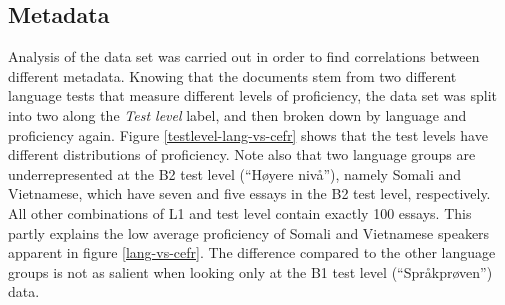 \subsection{Metadata}

Analysis of the data set was carried out in order to find correlations
between different metadata. Knowing that the documents stem from two
different language tests that measure different levels of proficiency, the
data set was split into two along the \emph{Test level} label, and then broken
down by language and proficiency again. Figure \ref{testlevel-lang-vs-cefr}
shows that the test levels have different distributions of proficiency. Note
also that two language groups are underrepresented at the B2 test level
(``Høyere nivå''), namely Somali and Vietnamese, which have seven and five
essays in the B2 test level, respectively. All other combinations of L1 and
test level contain exactly 100 essays. This partly explains the low average
proficiency of Somali and Vietnamese speakers apparent in figure
\ref{lang-vs-cefr}. The difference compared to the other language groups is
not as salient when looking only at the B1 test level (``Språkprøven'') data.
